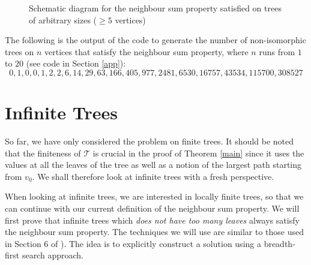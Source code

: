 \documentclass[11pt]{article}
\begin{document}
\begin{figure}[htp!]
    \centering
    \caption{Schematic diagram for the neighbour sum property satisfied on trees of arbitrary sizes ($\geq 5$ vertices)}
    \label{paths}
\end{figure}

The following is the output of the code to generate the number of non-isomorphic trees on $n$ vertices that satisfy the neighbour sum property, where $n$ runs from $1$ to $20$ (see code in Section \ref{app}):
$$0,1,0,0,1,2,2,6,14,29,63,166,405,977,2481,6530,16757,43534, 115700,308527$$

\section{Infinite Trees}\label{infinite}
So far, we have only considered the problem on finite trees. It should be noted that the finiteness of $\mathcal T$ is crucial in the proof of Theorem \ref{main} since it uses the values at all the leaves of the tree as well as a notion of the largest path starting from $v_0$. We shall therefore look at infinite trees with a fresh perspective.

When looking at infinite trees, we are interested in locally finite trees, so that we can continue with our current definition of the neighbour sum property. We will first prove that infinite trees which \textit{does not have too many leaves} always satisfy the neighbour sum property. The techniques we will use are similar to those used in Section $6$ of \cite{sayan}). The idea is to explicitly construct a solution using a breadth-first search approach.
\end{document}
